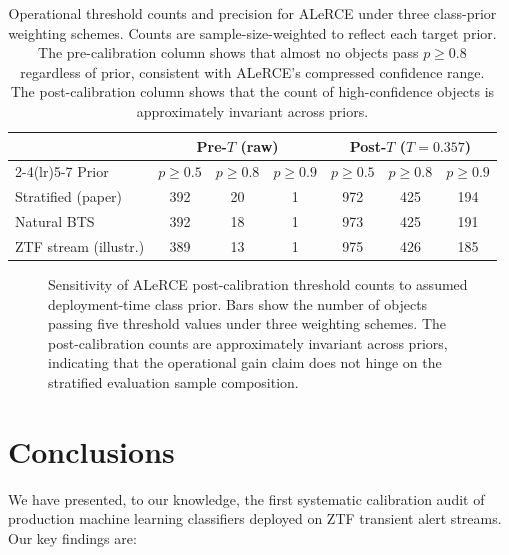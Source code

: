 \documentclass[twocolumn]{aastex631}
\begin{document}
\begin{table}[t]
\centering
\caption{Operational threshold counts and precision for ALeRCE under
three class-prior weighting schemes. Counts are sample-size-weighted
to reflect each target prior. The pre-calibration column shows that
almost no objects pass $p \geq 0.8$ regardless of prior, consistent
with ALeRCE's compressed confidence range. The post-calibration column
shows that the count of high-confidence objects is approximately
invariant across priors.
\label{tab:prior_sensitivity}}
\begin{tabular}{lcccccc}
\toprule
 & \multicolumn{3}{c}{Pre-$T$ (raw)} & \multicolumn{3}{c}{Post-$T$ ($T = 0.357$)} \\
\cmidrule(lr){2-4}\cmidrule(lr){5-7}
Prior & $p \geq 0.5$ & $p \geq 0.8$ & $p \geq 0.9$
& $p \geq 0.5$ & $p \geq 0.8$ & $p \geq 0.9$ \\
\midrule
Stratified (paper) & 392 & 20 & 1 & 972 & 425 & 194 \\
Natural BTS        & 392 & 18 & 1 & 973 & 425 & 191 \\
ZTF stream (illustr.) & 389 & 13 & 1 & 975 & 426 & 185 \\
\bottomrule
\end{tabular}
\end{table}

\begin{figure}[!b]
\caption{Sensitivity of ALeRCE post-calibration threshold counts to
assumed deployment-time class prior. Bars show the number of objects
passing five threshold values under three weighting schemes. The
post-calibration counts are approximately invariant across priors,
indicating that the operational gain claim does not hinge on the
stratified evaluation sample composition. \label{fig:prior_sensitivity}}
\end{figure}


\section{Conclusions} \label{sec:conclusions}

We have presented, to our knowledge, the first systematic calibration audit of production machine learning classifiers deployed on ZTF transient alert streams. Our key findings are:
\end{document}

